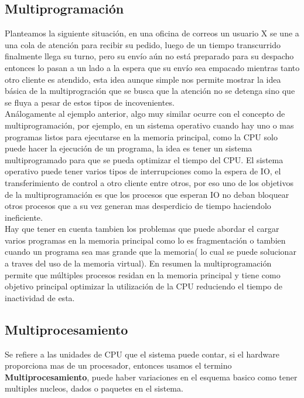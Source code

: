 \documentclass[conference,letterpaper]{IEEEtran}
\begin{document}
\subsection{Multiprogramaci\'on}
Planteamos la siguiente situación, en una oficina de correos un usuario X se une a una cola de atención para recibir su pedido, luego de un tiempo transcurrido finalmente llega su turno, pero su envío aún no está preparado para su despacho entonces lo pasan a un lado a la espera que su envío sea empacado mientras tanto otro cliente es atendido, esta idea aunque simple nos permite mostrar  la idea básica de la multiprogración que se busca que la atención no se detenga sino que se fluya a pesar de estos tipos de incovenientes.\\

Análogamente al ejemplo anterior, algo muy similar ocurre con el concepto de multiprogramación, por ejemplo, en un sistema operativo cuando hay uno o mas programas listos para ejecutarse en la memoria principal, como la CPU solo puede hacer la ejecución de un programa, la idea es tener un sistema multiprogramado para que se pueda optimizar el tiempo del CPU. El sistema operativo puede tener varios tipos de interrupciones como la espera de IO, el transferimiento de control a otro cliente entre otros, por eso uno de los objetivos de la multiprogramación es que los procesos que esperan IO no deban bloquear otros procesos que a su vez generan mas desperdicio de tiempo haciendolo ineficiente.\\

Hay que tener en cuenta tambien los problemas que puede abordar el cargar varios programas en la memoria principal como lo es fragmentación o tambien cuando un programa sea mas grande que la memoria( lo cual se puede solucionar a traves del uso de la memoria virtual). En resumen la multiprogramación permite que múltiples procesos residan en la memoria principal y tiene como objetivo principal optimizar la utilización  de la CPU reduciendo el tiempo de inactividad de esta.\\

\subsection{Multiprocesamiento}
Se refiere a las unidades de CPU que el sistema puede contar, si el hardware proporciona mas de un procesador, entonces usamos el termino \textbf{Multiprocesamiento}, puede haber variaciones en el esquema basico como tener multiples nucleos, dados o paquetes en el sistema.
\end{document}
